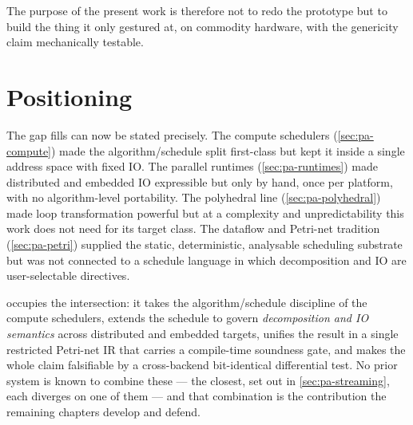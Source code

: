 The purpose of the present work is therefore not to redo the prototype but to
build the thing it only gestured at, on commodity hardware, with the genericity
claim mechanically testable.

\section{Positioning}\label{sec:pa-positioning}

The gap \nuc{} fills can now be stated precisely. The compute schedulers
(\cref{sec:pa-compute}) made the algorithm/schedule split first-class but kept it
inside a single address space with fixed IO. The parallel runtimes
(\cref{sec:pa-runtimes}) made distributed and embedded IO expressible but only by
hand, once per platform, with no algorithm-level portability. The polyhedral
line (\cref{sec:pa-polyhedral}) made loop transformation powerful but at a
complexity and unpredictability this work does not need for its target class. The
dataflow and Petri-net tradition (\cref{sec:pa-petri}) supplied the static,
deterministic, analysable scheduling substrate but was not connected to a
schedule language in which decomposition and IO are user-selectable directives.

\nuc{} occupies the intersection: it takes the algorithm/schedule discipline of
the compute schedulers, extends the schedule to govern \emph{decomposition and IO
semantics} across distributed and embedded targets, unifies the result in a
single restricted Petri-net IR that carries a compile-time soundness gate, and
makes the whole claim falsifiable by a cross-backend bit-identical differential
test. No prior system is known to combine these --- the closest, set
out in \cref{sec:pa-streaming}, each diverges on one of them --- and that
combination is the contribution the remaining chapters develop and defend.
